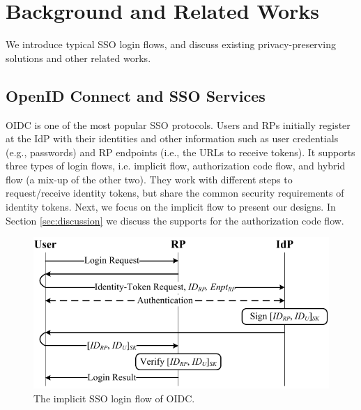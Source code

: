 \section{Background and Related Works}
\label{sec:background}

We introduce %
typical SSO login flows, and discuss existing privacy-preserving solutions and other related works.

\subsection{OpenID Connect and SSO Services}
\label{subsec:OIDC}
OIDC is one of the most popular SSO protocols.
Users and RPs initially register at the IdP with their identities
and other information such as user credentials (e.g., passwords)
and RP endpoints (i.e., the URLs to receive tokens).
It supports three types of login flows, i.e. implicit flow, authorization code flow, and hybrid flow (a mix-up of the other two).
They work with different steps to request/receive identity tokens, but share the common security requirements of identity tokens.
Next, we focus on the implicit flow to present our designs. In Section \ref{sec:discussion} we discuss the supports for the authorization code flow.

\begin{figure}[t]
  \centering
  \includegraphics[width=0.9\linewidth]{fig/OIDC1.pdf}
  \caption{The implicit SSO login flow of OIDC.}
  \label{fig:OpenID}
\end{figure}

